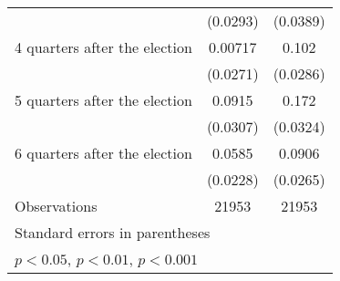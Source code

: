 \begin{table}[htbp]
\begin{tabular}{l*{2}{c}}
                    &    (0.0293)         &    (0.0389)         \\
[1em]
 4 quarters after the election&     0.00717         &       0.102\sym{***}\\
                    &    (0.0271)         &    (0.0286)         \\
[1em]
 5 quarters after the election&      0.0915\sym{**} &       0.172\sym{***}\\
                    &    (0.0307)         &    (0.0324)         \\
[1em]
 6 quarters after the election&      0.0585\sym{*}  &      0.0906\sym{***}\\
                    &    (0.0228)         &    (0.0265)         \\
\hline
Observations        &       21953         &       21953         \\
\hline\hline
\multicolumn{3}{l}{\footnotesize Standard errors in parentheses}\\
\multicolumn{3}{l}{\footnotesize \sym{*} \(p<0.05\), \sym{**} \(p<0.01\), \sym{***} \(p<0.001\)}\\
\end{tabular}
\end{table}
